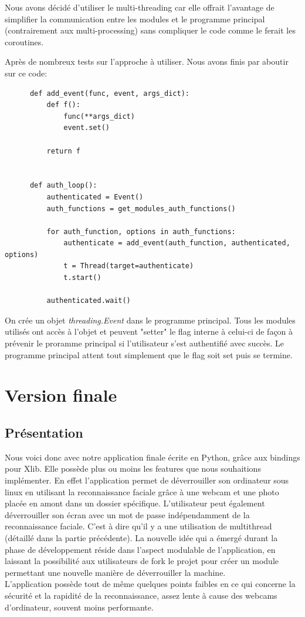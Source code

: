 \documentclass[french]{report}
\begin{document}
Nous avons décidé d'utiliser le multi-threading car elle offrait l'avantage de simplifier
la communication entre les modules et le programme principal (contrairement aux multi-processing) sans compliquer le code comme le ferait les coroutines.

Après de nombreux tests sur l'approche à utiliser. Nous avons finis par aboutir sur ce code:

  \begin{verbatim}
      def add_event(func, event, args_dict):
          def f():
              func(**args_dict)
              event.set()

          return f


      def auth_loop():
          authenticated = Event()
          auth_functions = get_modules_auth_functions()

          for auth_function, options in auth_functions:
              authenticate = add_event(auth_function, authenticated, options)
              t = Thread(target=authenticate)
              t.start()

          authenticated.wait()
    \end{verbatim}

On crée un objet \emph{threading.Event} dans le programme principal. Tous les modules
utilisés ont accès à l'objet et peuvent "setter" le flag interne à celui-ci de façon
à prévenir le proramme principal si l'utilisateur s'est authentifié avec succès.
Le programme principal attent tout simplement que le flag soit set puis se termine.


\chapter{Version finale}

\newpage

\section{Présentation}
Nous voici donc avec notre application finale écrite en Python, grâce aux bindings
pour Xlib. Elle possède plus ou moins les features que nous souhaitions
implémenter. En effet l'application permet de déverrouiller son ordinateur sous linux
en utilisant la reconnaissance faciale grâce à une webcam et une photo placée
en amont dans un dossier spécifique. L'utilisateur peut également déverrouiller
son écran avec un mot de passe indépendamment de la reconnaissance faciale. C'est
à dire qu'il y a une utilisation de multithread (détaillé dans la partie précédente).
La nouvelle idée qui a émergé durant la phase de développement réside dans
l'aspect modulable de l'application, en laissant la possibilité aux utilisateurs
de fork le projet pour créer un module permettant une nouvelle manière de
déverrouiller la machine.\\
L'application possède tout de même quelques points faibles en ce qui concerne la
sécurité et la rapidité de la reconnaissance, assez lente à cause des webcams
d'ordinateur, souvent moins performante.
\end{document}
